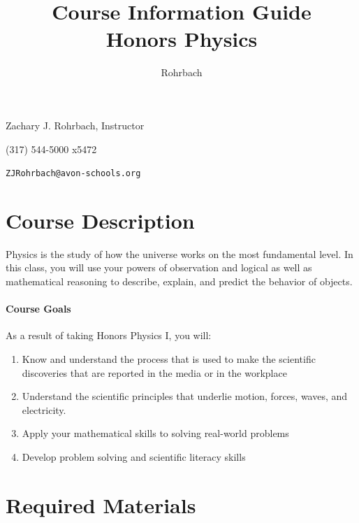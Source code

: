 \documentclass[10pt]{exam}
\title{Course Information Guide \\ Honors Physics}
\author{Rohrbach}
\newcommand{\phonenumber}{(317) 544-5000 x5472}
\begin{document}
\maketitle

\noindent Zachary J. Rohrbach, Instructor

\noindent \phonenumber

\noindent \texttt{ZJRohrbach@avon-schools.org}


\section*{Course Description}
\vspace{-1em}

Physics is the study of how the universe works on the most fundamental level.  In this 
class, you will use your powers of observation and logical as well as mathematical 
reasoning to describe, explain, and predict the behavior of objects.

\vspace{-1em}

\paragraph{Course Goals} 
As a result of taking Honors Physics I, you will:

\vspace{-0.5em}


\begin{enumerate}
	\item Know and understand the process that is used to make the scientific discoveries that 
				are reported in the media or in the workplace
	\item Understand the scientific principles that underlie motion, forces, waves, and electricity.
	\item Apply your mathematical skills to solving real-world problems
	\item Develop problem solving and scientific literacy skills
\end{enumerate}


\section*{Required Materials}
\vspace{-1em}
\end{document}
